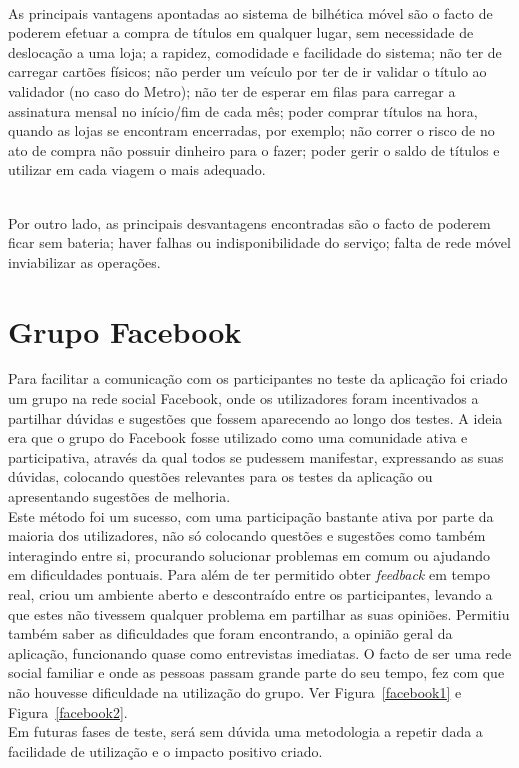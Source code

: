 ~\\As principais vantagens apontadas ao sistema de bilhética móvel são o facto de poderem efetuar a compra de títulos em qualquer lugar, sem necessidade de deslocação a uma loja; a rapidez, comodidade e facilidade do sistema; não ter de carregar cartões físicos; não perder um veículo por ter de ir validar o título ao validador (no caso do Metro); não ter de esperar em filas para carregar a assinatura mensal no início/fim de cada mês; poder comprar títulos na hora, quando as lojas se encontram encerradas, por exemplo; não correr o risco de no ato de compra não possuir dinheiro para o fazer; poder gerir o saldo de títulos e utilizar em cada viagem o mais adequado.

~\\Por outro lado, as principais desvantagens encontradas são o facto de poderem ficar sem bateria; haver falhas ou indisponibilidade do serviço; falta de rede móvel inviabilizar as operações.

\section{Grupo Facebook}

Para facilitar a comunicação com os participantes no teste da aplicação foi criado um grupo na rede social Facebook, onde os utilizadores foram incentivados a partilhar dúvidas e sugestões que fossem aparecendo ao longo dos testes. A ideia era que o grupo do Facebook fosse utilizado como uma comunidade ativa e participativa, através da qual todos se pudessem manifestar, expressando as suas dúvidas, colocando questões relevantes para os testes da aplicação ou apresentando sugestões de melhoria.
\\Este método foi um sucesso, com uma participação bastante ativa por parte da maioria dos utilizadores, não só colocando questões e sugestões como também interagindo entre si, procurando solucionar problemas em comum ou ajudando em dificuldades pontuais. Para além de ter permitido obter \emph{feedback} em tempo real, criou um ambiente aberto e descontraído entre os participantes, levando a que estes não tivessem qualquer problema em partilhar as suas opiniões. Permitiu também saber as dificuldades que foram encontrando, a opinião geral da aplicação, funcionando quase como entrevistas imediatas. O facto de ser uma rede social familiar e onde as pessoas passam grande parte do seu tempo, fez com que não houvesse dificuldade na utilização do grupo. Ver Figura~\ref{facebook1} e Figura~\ref{facebook2}.
\\Em futuras fases de teste, será sem dúvida uma metodologia a repetir dada a facilidade de utilização e o impacto positivo criado.

